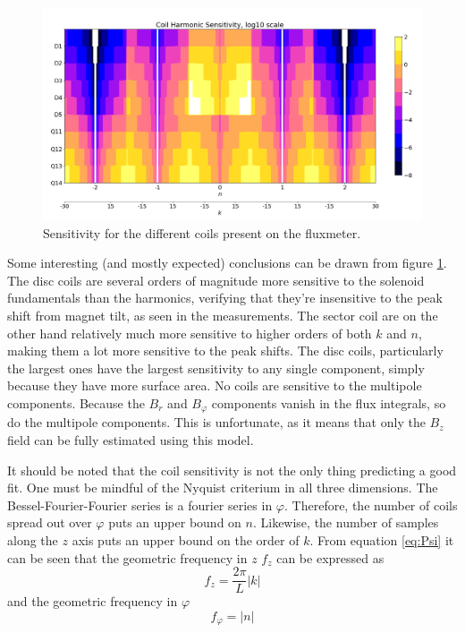 \begin{figure}[!h]
    \includegraphics[width=\linewidth]{figs/sensitivity}
    \caption{Sensitivity for the different coils present on
        the fluxmeter.}
    \label{fig:sensitivity}
\end{figure}

Some interesting (and mostly expected) conclusions can be drawn
from figure \ref{fig:sensitivity}. The disc coils are
several orders of magnitude more sensitive to the
solenoid fundamentals than the harmonics, verifying that
they're insensitive to the peak shift from magnet tilt, as
seen in the measurements. The sector coil are on the other
hand relatively much more sensitive to higher orders of both $k$
and $n$, making them a lot more sensitive to the peak shifts.
The disc coils, particularly the largest ones have the largest
sensitivity to any single component, simply because they have more
surface area.
No coils are sensitive to the multipole components. Because
the $B_r$ and $B_\varphi$ components vanish in the flux integrals,
so do the multipole components. This is unfortunate, as it means
that only the $B_z$ field can be fully estimated using this model.

It should be noted that the coil sensitivity is not the only thing
predicting a good fit. One must be mindful of the Nyquist criterium
in all three dimensions. The Bessel-Fourier-Fourier series is
a fourier series in $\varphi$. Therefore, the number of coils
spread out over $\varphi$ puts an upper bound on $n$.
Likewise, the number of samples
along the $z$ axis puts an upper bound on the order of $k$. From
equation \ref{eq:Psi} it can be seen that the geometric frequency
in $z$ $f_z$ can be expressed as
\begin{equation}
    f_z = \frac{2\pi}{L}|k|
    \label{eq:fz}
\end{equation}
and the geometric frequency in $\varphi$
\begin{equation}
    f_{\varphi} = |n|
    \label{eq:fphi}
\end{equation}

